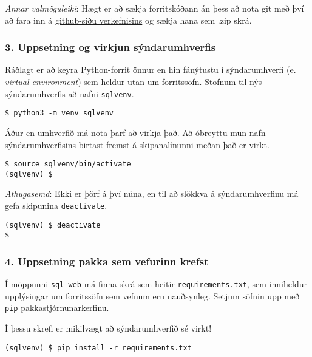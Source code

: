 \emph{Annar valmöguleiki}: Hægt er að sækja forritskóðann án þess að
nota git með því að fara inn á
\href{https://github.com/Ernir/sql-web}{github-síðu verkefnisins} og
sækja hana sem .zip skrá.

\subsubsection{3. Uppsetning og virkjun
sýndarumhverfis}\label{uppsetning-og-virkjun-suxfdndarumhverfis}

Ráðlagt er að keyra Python-forrit önnur en hin fánýtustu í
sýndarumhverfi (e. \emph{virtual environment}) sem heldur utan um
forritssöfn. Stofnum til nýs sýndarumhverfis að nafni \texttt{sqlvenv}.

\begin{verbatim}
$ python3 -m venv sqlvenv
\end{verbatim}

Áður en umhverfið má nota þarf að virkja það. Að óbreyttu mun nafn
sýndarumhverfisins birtast fremst á skipanalínunni meðan það er virkt.

\begin{verbatim}
$ source sqlvenv/bin/activate
(sqlvenv) $ 
\end{verbatim}

\emph{Athugasemd}: Ekki er þörf á því núna, en til að slökkva á
sýndarumhverfinu má gefa skipunina \texttt{deactivate}.

\begin{verbatim}
(sqlvenv) $ deactivate 
$
\end{verbatim}

\subsubsection{4. Uppsetning pakka sem vefurinn
krefst}\label{uppsetning-pakka-sem-vefurinn-krefst}

Í möppunni \texttt{sql-web} má finna skrá sem heitir
\texttt{requirements.txt}, sem inniheldur upplýsingar um forritssöfn sem
vefnum eru nauðsynleg. Setjum söfnin upp með \texttt{pip}
pakkastjórnunarkerfinu.

Í þessu skrefi er mikilvægt að sýndarumhverfið sé virkt!

\begin{verbatim}
(sqlvenv) $ pip install -r requirements.txt
\end{verbatim}

